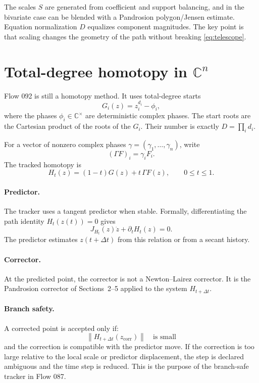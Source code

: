 \documentclass[11pt,a4paper]{article}
\theoremstyle{definition}
\theoremstyle{plain}
\theoremstyle{remark}
\newcommand{\C}{\mathbb C}
\newcommand{\norm}[1]{\left\lVert #1\right\rVert}
\begin{document}
The scales \(S\) are generated from coefficient and support balancing, and in
the bivariate case can be blended with a Pandrosion polygon/Jensen estimate.
Equation normalization \(D\) equalizes component magnitudes.  The key point is
that scaling changes the geometry of the path without breaking
\eqref{eq:telescope}.

\section{Total-degree homotopy in \texorpdfstring{\(\C^n\)}{C n}}

Flow 092 is still a homotopy method.  It uses total-degree starts
\[
  G_i(z)=z_i^{d_i}-\phi_i,
\]
where the phases \(\phi_i\in\C^\times\) are deterministic complex phases.  The
start roots are the Cartesian product of the roots of the \(G_i\).  Their number
is exactly \(D=\prod_i d_i\).

For a vector of nonzero complex phases \(\gamma=(\gamma_1,\ldots,\gamma_n)\),
write
\[
  (\Gamma F)_i=\gamma_iF_i.
\]
The tracked homotopy is
\begin{equation}
  \label{eq:homotopy}
  H_t(z)=(1-t)G(z)+t\,\Gamma F(z),
  \qquad 0\le t\le1.
\end{equation}

\paragraph{Predictor.}
The tracker uses a tangent predictor when stable.  Formally, differentiating the
path identity \(H_t(z(t))=0\) gives
\begin{equation*}
  J_{H_t}(z)\dot z+\partial_t H_t(z)=0.
\end{equation*}
The predictor estimates \(z(t+\Delta t)\) from this relation or from a secant
history.

\paragraph{Corrector.}
At the predicted point, the corrector is not a Newton--Lairez corrector.  It is
the Pandrosion corrector of Sections~2--5 applied to the system \(H_{t+\Delta
t}\).

\paragraph{Branch safety.}
A corrected point is accepted only if:
\[
  \norm{H_{t+\Delta t}(z_{\mathrm{corr}})}
  \quad\text{is small}
\]
and the correction is compatible with the predictor move.  If the correction is
too large relative to the local scale or predictor displacement, the step is
declared ambiguous and the time step is reduced.  This is the purpose of the
branch-safe tracker in Flow 087.
\end{document}
